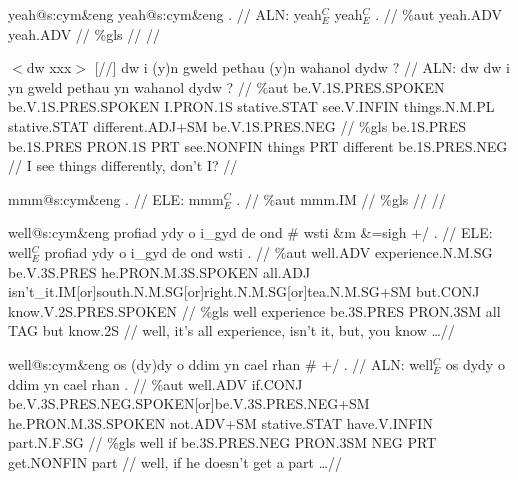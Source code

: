 \documentclass[a4paper,10pt]{article}
\begin{document}
\ex
\begingl[lingstyle=gergl]
\glchat yeah@s:cym\&eng yeah@s:cym\&eng . //
\glsurface ALN:  yeah$^{C}_{E}$ yeah$^{C}_{E}$ .  //
\glauto \%aut  yeah{\scriptsize .ADV} yeah{\scriptsize .ADV}   //
\glmanual \%gls      //
\gleng  //
\endgl
\xe

\ex
\begingl[lingstyle=gergl]
\glchat $<$dw xxx$>$ [//] dw i (y)n gweld pethau (y)n wahanol dydw ? //
\glsurface ALN:  dw dw i yn gweld pethau yn wahanol dydw ?  //
\glauto \%aut  be{\scriptsize .V.1S.PRES.SPOKEN} be{\scriptsize .V.1S.PRES.SPOKEN} I{\scriptsize .PRON.1S} stative{\scriptsize .STAT} see{\scriptsize .V.INFIN} things{\scriptsize .N.M.PL} stative{\scriptsize .STAT} different{\scriptsize .ADJ+SM} be{\scriptsize .V.1S.PRES.NEG}   //
\glmanual \%gls  be{\scriptsize .1S.PRES} be{\scriptsize .1S.PRES} PRON{\scriptsize .1S} PRT see{\scriptsize .NONFIN} things PRT different be{\scriptsize .1S.PRES.NEG}   //
\gleng I see things differently, don't I? //
\endgl
\xe

\ex
\begingl[lingstyle=gergl]
\glchat mmm@s:cym\&eng . //
\glsurface ELE:  mmm$^{C}_{E}$ .  //
\glauto \%aut  mmm{\scriptsize .IM}   //
\glmanual \%gls     //
\gleng  //
\endgl
\xe

\ex
\begingl[lingstyle=gergl]
\glchat well@s:cym\&eng profiad ydy o i\_gyd de ond \# wsti \&m \&=sigh +/ . //
\glsurface ELE:  well$^{C}_{E}$ profiad ydy o i\_gyd de ond wsti .  //
\glauto \%aut  well{\scriptsize .ADV} experience{\scriptsize .N.M.SG} be{\scriptsize .V.3S.PRES} he{\scriptsize .PRON.M.3S.SPOKEN} all{\scriptsize .ADJ} isn't\_it{\scriptsize .IM[or]south.N.M.SG[or]right.N.M.SG[or]tea.N.M.SG+SM} but{\scriptsize .CONJ} know{\scriptsize .V.2S.PRES.SPOKEN}   //
\glmanual \%gls  well experience be{\scriptsize .3S.PRES} PRON{\scriptsize .3SM} all TAG but know{\scriptsize .2S}   //
\gleng well, it's all experience, isn't it, but, you know \dots  //
\endgl
\xe

\ex
\begingl[lingstyle=gergl]
\glchat well@s:cym\&eng os (dy)dy o ddim yn cael rhan \# +/ . //
\glsurface ALN:  well$^{C}_{E}$ os dydy o ddim yn cael rhan .  //
\glauto \%aut  well{\scriptsize .ADV} if{\scriptsize .CONJ} be{\scriptsize .V.3S.PRES.NEG.SPOKEN[or]be.V.3S.PRES.NEG+SM} he{\scriptsize .PRON.M.3S.SPOKEN} not{\scriptsize .ADV+SM} stative{\scriptsize .STAT} have{\scriptsize .V.INFIN} part{\scriptsize .N.F.SG}   //
\glmanual \%gls  well if be{\scriptsize .3S.PRES.NEG} PRON{\scriptsize .3SM} NEG PRT get{\scriptsize .NONFIN} part   //
\gleng well, if he doesn't get a part \dots  //
\endgl
\xe
\end{document}
